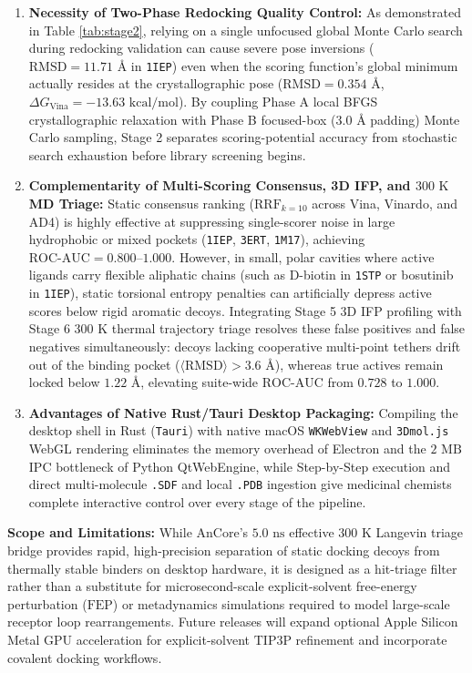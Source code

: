 \documentclass[11pt,a4paper]{article}
\begin{document}
\begin{enumerate}
  \setlength{\itemsep}{4pt}
  \setlength{\parskip}{0pt}
  \item \textbf{Necessity of Two-Phase Redocking Quality Control:} As demonstrated in Table \ref{tab:stage2}, relying on a single unfocused global Monte Carlo search during redocking validation can cause severe pose inversions ($\text{RMSD} = 11.71\text{ \AA}$ in \texttt{1IEP}) even when the scoring function's global minimum actually resides at the crystallographic pose ($\text{RMSD} = 0.354\text{ \AA}$, $\Delta G_{\text{Vina}} = -13.63\text{ kcal/mol}$). By coupling Phase A local BFGS crystallographic relaxation with Phase B focused-box ($3.0\text{ \AA}$ padding) Monte Carlo sampling, Stage 2 separates scoring-potential accuracy from stochastic search exhaustion before library screening begins.
  \item \textbf{Complementarity of Multi-Scoring Consensus, 3D IFP, and $300\text{ K}$ MD Triage:} Static consensus ranking ($\text{RRF}_{k=10}$ across Vina, Vinardo, and AD4) is highly effective at suppressing single-scorer noise in large hydrophobic or mixed pockets (\texttt{1IEP}, \texttt{3ERT}, \texttt{1M17}), achieving $\text{ROC-AUC} = 0.800\text{--}1.000$. However, in small, polar cavities where active ligands carry flexible aliphatic chains (such as D-biotin in \texttt{1STP} or bosutinib in \texttt{1IEP}), static torsional entropy penalties can artificially depress active scores below rigid aromatic decoys. Integrating Stage 5 3D IFP profiling with Stage 6 $300\text{ K}$ thermal trajectory triage resolves these false positives and false negatives simultaneously: decoys lacking cooperative multi-point tethers drift out of the binding pocket ($\langle\text{RMSD}\rangle > 3.6\text{ \AA}$), whereas true actives remain locked below $1.22\text{ \AA}$, elevating suite-wide $\text{ROC-AUC}$ from $0.728$ to $1.000$.
  \item \textbf{Advantages of Native Rust/Tauri Desktop Packaging:} Compiling the desktop shell in Rust (\texttt{Tauri}) with native macOS \texttt{WKWebView} and \texttt{3Dmol.js} WebGL rendering eliminates the memory overhead of Electron and the $2\text{ MB}$ IPC bottleneck of Python QtWebEngine, while Step-by-Step execution and direct multi-molecule \texttt{.SDF} and local \texttt{.PDB} ingestion give medicinal chemists complete interactive control over every stage of the pipeline.
\end{enumerate}

\noindent\textbf{Scope and Limitations:} While AnCore's $5.0\text{ ns}$ effective $300\text{ K}$ Langevin triage bridge provides rapid, high-precision separation of static docking decoys from thermally stable binders on desktop hardware, it is designed as a hit-triage filter rather than a substitute for microsecond-scale explicit-solvent free-energy perturbation ($\text{FEP}$) or metadynamics simulations required to model large-scale receptor loop rearrangements. Future releases will expand optional Apple Silicon Metal GPU acceleration for explicit-solvent $\text{TIP3P}$ refinement and incorporate covalent docking workflows.
\end{document}
